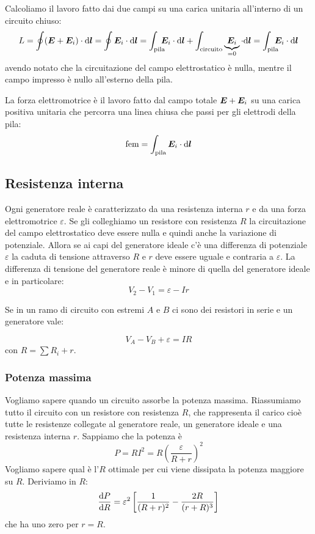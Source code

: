 Calcoliamo il lavoro fatto dai due campi su una carica unitaria all'interno di un circuito chiuso:
\begin{equation}
  L = \oint (\ve E+\ve E_i)\cdot\ud\ve l = \oint \ve E_i\cdot\ud\ve l = \int_{\text{pila}}\!\!\!\! \ve E_i\cdot\ud\ve l + \int_{\text{circuito}} \underbrace{\ve E_i}_{=0}\cdot\ud\ve l = \int_{\text{pila}}\!\!\!\!\ve E_i\cdot\ud\ve l
\end{equation}
avendo notato che la circuitazione del campo elettrostatico è nulla, mentre il campo impresso è nullo all'esterno della pila.
\begin{Def}[fem]
  La forza elettromotrice è il lavoro fatto dal campo totale $\boldsymbol{E}+\boldsymbol{E}_i$ su una carica positiva unitaria che percorra una linea chiusa che passi per gli elettrodi della pila:
  \begin{equation}
    \text{fem} = \int_{\text{pila}} \boldsymbol{E}_i\cdot\mathrm{d}\boldsymbol{l}
  \end{equation}

\end{Def}

\subsection{Resistenza interna}
Ogni generatore reale è caratterizzato da una resistenza interna $r$ e da una forza elettromotrice $\varepsilon$. Se gli colleghiamo un resistore con resistenza $R$ la circuitazione del campo elettrostatico deve essere nulla e quindi anche la variazione di potenziale. Allora se ai capi del generatore ideale c'è una differenza di potenziale $\varepsilon$ la caduta di tensione attraverso $R$ e $r$ deve essere uguale e contraria a $\varepsilon$. La differenza di tensione del generatore reale è minore di quella del generatore ideale e in particolare:
\[V_2-V_1=\varepsilon-Ir\]

Se in un ramo di circuito con estremi $A$ e $B$ ci sono dei resistori in serie e un generatore vale:
\begin{legge}
  \begin{equation}
    V_A-V_B+\varepsilon=IR
    \label{Ohm_gen}
  \end{equation}
  con $R=\sum R_i+r$.
\end{legge}
\subsubsection{Potenza massima}
Vogliamo sapere quando un circuito assorbe la potenza massima. Riassumiamo tutto il circuito con un resistore con resistenza $R$, che rappresenta il carico cioè tutte le resistenze collegate al generatore reale, un generatore ideale e una resistenza interna $r$. Sappiamo che la potenza è
\[P=RI^2=R\left(\frac{\varepsilon}{R+r}\right)^2\]
Vogliamo sapere qual è l'$R$ ottimale per cui viene dissipata la potenza maggiore su $R$. Deriviamo in $R$:
\[\frac{\mathrm{d} P}{\mathrm{d} R}=\varepsilon^2\left[\frac{1}{(R+r)^2}-\frac{2R}{(r+R)^3}\right]\]
che ha uno zero per $r=R$.

